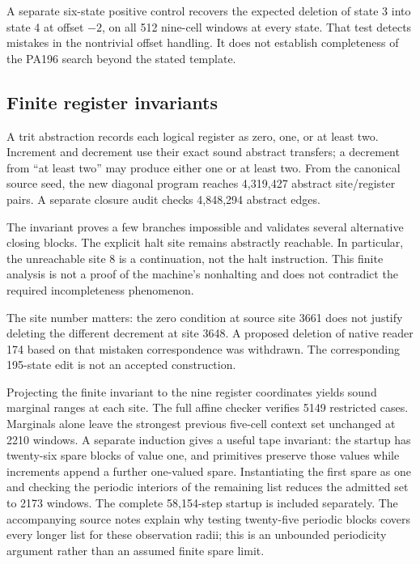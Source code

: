 A separate six-state positive control recovers the expected deletion of state 3 into state 4 at offset $-2$, on all 512 nine-cell windows at every state. That test detects mistakes in the nontrivial offset handling. It does not establish completeness of the PA196 search beyond the stated template.

\subsection{Finite register invariants}
A trit abstraction records each logical register as zero, one, or at least two. Increment and decrement use their exact sound abstract transfers; a decrement from ``at least two'' may produce either one or at least two. From the canonical source seed, the new diagonal program reaches 4,319,427 abstract site/register pairs. A separate closure audit checks 4,848,294 abstract edges.

The invariant proves a few branches impossible and validates several alternative closing blocks. The explicit halt site remains abstractly reachable. In particular, the unreachable site 8 is a continuation, not the halt instruction. This finite analysis is not a proof of the machine's nonhalting and does not contradict the required incompleteness phenomenon.

The site number matters: the zero condition at source site 3661 does not justify deleting the different decrement at site 3648. A proposed deletion of native reader 174 based on that mistaken correspondence was withdrawn. The corresponding 195-state edit is not an accepted construction.

Projecting the finite invariant to the nine register coordinates yields sound marginal ranges at each site. The full affine checker verifies 5149 restricted cases. Marginals alone leave the strongest previous five-cell context set unchanged at 2210 windows. A separate induction gives a useful tape invariant: the startup has twenty-six spare blocks of value one, and primitives preserve those values while increments append a further one-valued spare. Instantiating the first spare as one and checking the periodic interiors of the remaining list reduces the admitted set to 2173 windows. The complete 58,154-step startup is included separately. The accompanying source notes explain why testing twenty-five periodic blocks covers every longer list for these observation radii; this is an unbounded periodicity argument rather than an assumed finite spare limit.

